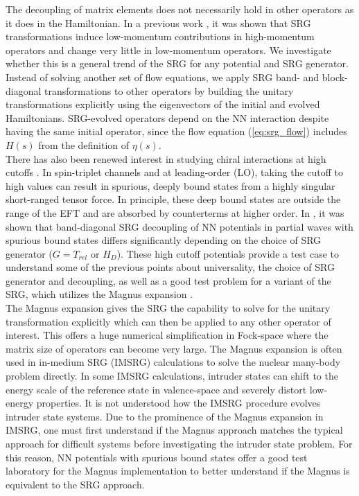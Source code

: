 \documentclass[preprintnumbers,floatfix,aps,prc,preprint,nofootinbib]{revtex4-1}
\begin{document}
The decoupling of matrix elements does not necessarily hold in other operators as it does in the Hamiltonian. In a previous work \cite{Anderson:2010aq}, it was shown that SRG transformations induce low-momentum contributions in high-momentum operators and change very little in low-momentum operators. We investigate whether this is a general trend of the SRG for any potential and SRG generator. Instead of solving another set of flow equations, we apply SRG band- and block-diagonal transformations to other operators by building the unitary transformations explicitly using the eigenvectors of the initial and evolved Hamiltonians. SRG-evolved operators depend on the NN interaction despite having the same initial operator, since the flow equation (\ref{eq:srg_flow}) includes $H(s)$ from the definition of $\eta(s)$.
\\

There has also been renewed interest in studying chiral interactions at high cutoffs \cite{Tews:2018sbi}. In spin-triplet channels and at leading-order (LO), taking the cutoff to high values can result in spurious, deeply bound states from a highly singular short-ranged tensor force. In principle, these deep bound states are outside the range of the EFT and are absorbed by counterterms at higher order. In \cite{Wendt:2011qj}, it was shown that band-diagonal SRG decoupling of NN potentials in partial waves with spurious bound states differs significantly depending on the choice of SRG generator ($G=T_{rel}$ or $H_{D}$). These high cutoff potentials provide a test case to understand some of the previous points about universality, the choice of SRG generator and decoupling, as well as a good test problem for a variant of the SRG, which utilizes the Magnus expansion \cite{Morris:2015yna}.
\\

The Magnus expansion gives the SRG the capability to solve for the unitary transformation explicitly which can then be applied to any other operator of interest. This offers a huge numerical simplification in Fock-space where the matrix size of operators can become very large. The Magnus expansion is often used in in-medium SRG (IMSRG) calculations to solve the nuclear many-body problem directly. In some IMSRG calculations, intruder states can shift to the energy scale of the reference state in valence-space and severely distort low-energy properties. It is not understood how the IMSRG procedure evolves intruder state systems. Due to the prominence of the Magnus expansion in IMSRG, one must first understand if the Magnus approach matches the typical approach for difficult systems before investigating the intruder state problem. For this reason, NN potentials with spurious bound states offer a good test laboratory for the Magnus implementation to better understand if the Magnus is equivalent to the SRG approach.
\\
\end{document}
